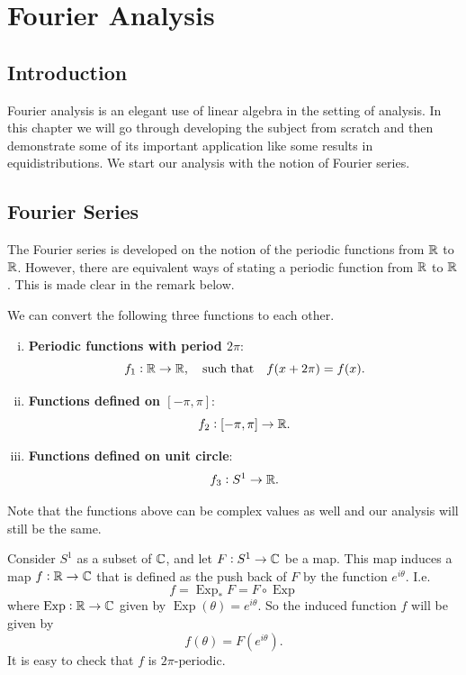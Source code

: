 \chapter{Fourier Analysis}

\section{Introduction}
Fourier analysis is an elegant use of linear algebra in the setting of analysis. In this chapter we will go through developing the subject from scratch and then demonstrate some of its important application like some results in equidistributions. We start our analysis with the notion of Fourier series.

\section{Fourier Series}
The Fourier series is developed on the notion of the periodic functions from $ \mathbb{R} $  to $ \mathbb{R} $. However, there are equivalent ways of stating a periodic function from $ \mathbb{R} $ to $ \mathbb{R} $. This is made clear in the remark below.

\begin{remark}
	We can convert the following three functions to each other.
	\begin{enumerate}[(i)]
		\item \textbf{Periodic functions with period $ 2\pi $}:
		\[ f_1: \mathbb{R} \to \mathbb{R}, \quad \text{such that} \quad f(x+2\pi) = f(x). \]
		\item \textbf{Functions defined on $ [-\pi,\pi] $}:
		\[ f_2: [-\pi,\pi]\to \mathbb{R}. \]
		\item \textbf{Functions defined on unit circle}:
		\[ f_3: S^1 \to \mathbb{R}. \]
	\end{enumerate}
	Note that the functions above can be complex values as well and our analysis will still be the same.
\end{remark}

\begin{remark}
	Consider $ S^1 $ as a subset of $ \mathbb{C} $, and let $ F: S^1\to \mathbb{C} $ be a map. This map induces a map $ f: \mathbb{R} \to \mathbb{C} $ that is defined as the push back of $ F $ by the function $ e^{i\theta} $. I.e.
	\[ f = \operatorname{Exp}_* F = F\circ \operatorname{Exp} \]
	where $ \operatorname{Exp}:\mathbb{R} \to \mathbb{C} $ given by $ \operatorname{Exp}(\theta) = e^{i\theta} $. So the induced function $ f $ will be given by
	\[ f(\theta) = F(e^{i\theta}). \]
	It is easy to check that $ f $ is $ 2\pi\text{-periodic} $.
\end{remark}

